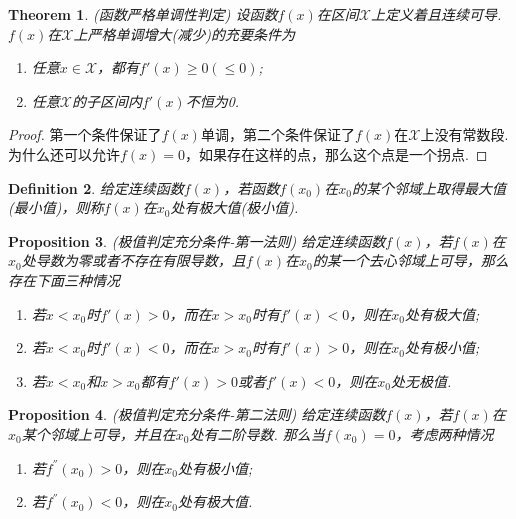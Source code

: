 \documentclass{article}
\newtheorem{theorem}{Theorem}[section]
\newtheorem{proposition}[theorem]{Proposition}
\newtheorem{definition}[theorem]{Definition}
\begin{document}
\begin{theorem}
\rm {\color{red} (函数严格单调性判定)} 设函数$f(x)$在区间$\mathcal{X}$上定义着且连续可导. $f(x)$在$\mathcal{X}$上严格单调增大(减少)的充要条件为
\begin{enumerate}
	\item 任意$x \in \mathcal{X}$，都有$f'(x) \geq 0(\leq 0)$;
	\item 任意$\mathcal{X}$的子区间内$f'(x)$不恒为0.
\end{enumerate}
\end{theorem}

\begin{proof}
{\color{blue}第一个条件保证了$f(x)$单调，第二个条件保证了$f(x)$在$\mathcal{X}$上没有常数段. 为什么还可以允许$f(x)=0$，如果存在这样的点，那么这个点是一个拐点}.
\end{proof}

\begin{definition}
\rm 给定连续函数$f(x)$，若函数$f(x_0)$在$x_0$的某个邻域上取得最大值(最小值)，则称$f(x)$在$x_0$处有{\color{red}极大值(极小值)}.
\end{definition}

\begin{proposition}
\rm {\color{red} (极值判定充分条件-第一法则)} \rm 给定连续函数$f(x)$，若$f(x)$在$x_0$处导数为零或者不存在有限导数，且$f(x)$在$x_0$的某一个去心邻域上可导，那么存在下面三种情况
\begin{enumerate}
	\item 若$x < x_0$时$f'(x) > 0$，而在$x > x_0$时有$f'(x) < 0$，则在$x_0$处有极大值;
	\item 若$x < x_0$时$f'(x) < 0$，而在$x > x_0$时有$f'(x) > 0$，则在$x_0$处有极小值;
	\item 若$x < x_0$和$x > x_0$都有$f'(x) > 0$或者$f'(x) < 0$，则在$x_0$处无极值.
\end{enumerate}
\end{proposition}


\begin{proposition}
\rm {\color{red} (极值判定充分条件-第二法则)} \rm 给定连续函数$f(x)$，若$f(x)$在$x_0$某个邻域上可导，并且在$x_0$处有二阶导数. 那么当$f(x_0) = 0$，考虑两种情况
\begin{enumerate}
	\item 若$f^{''}(x_0) > 0$，则在$x_0$处有极小值;
	\item 若$f^{''}(x_0) < 0$，则在$x_0$处有极大值.
\end{enumerate}
\end{proposition}
\end{document}
